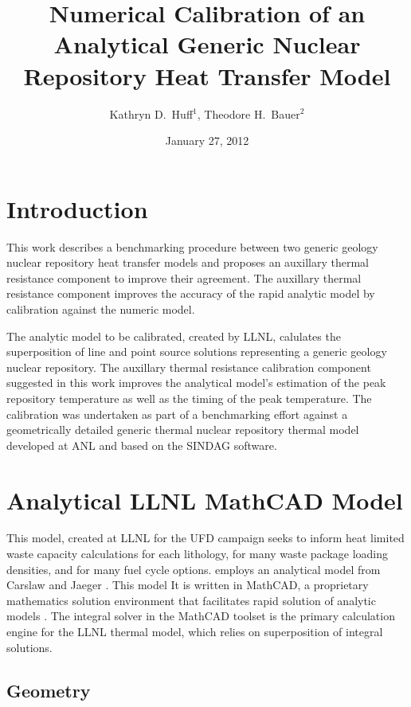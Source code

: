 \documentclass{anstrans}
\title{Numerical Calibration of an Analytical Generic Nuclear Repository Heat 
Transfer Model}
\author{Kathryn D.~Huff$^1$, Theodore H.~Bauer$^2$}
\institute{$^1$Nuclear Engineering \& Engineering Physics Dept., University of 
Wisconsin, Madison, WI, 53706\\
$^2$Nuclear Engineering Division, Argonne National Laboratory, Argonne, IL, 
60439}
\date{January 27, 2012}
\begin{document}
\section{Introduction}

This work describes a benchmarking procedure between two generic geology nuclear 
repository heat transfer models and proposes an auxillary thermal resistance 
component to improve their agreement. The auxillary thermal resistance component 
improves the accuracy of the rapid analytic model by calibration against
the numeric model. 

The analytic model to be calibrated, created by \gls{LLNL}, calulates the 
superposition of line and point source solutions representing a generic geology 
nuclear repository. The auxillary thermal resistance calibration component 
suggested in this work improves the analytical model's estimation of the peak 
repository temperature as well as the timing of the peak temperature. The 
calibration was undertaken as part of a benchmarking effort against a 
geometrically detailed generic thermal nuclear repository thermal model 
developed at \gls{ANL} and based on the \gls{SINDAG} software\cite{SINDAG}.




\section{Analytical LLNL MathCAD Model}

This model, created at \gls{LLNL} for the \gls{UFD} campaign seeks to inform 
heat limited waste capacity calculations for each lithology, for many waste 
package loading densities, and for many fuel cycle options.  employs an 
analytical model from Carslaw and Jaeger \cite{carslaw}.  This model It is 
written in MathCAD, a proprietary mathematics solution environment that 
facilitates rapid solution of analytic models \cite{MathCAD}. The integral solver in the 
MathCAD toolset is the primary calculation engine for the LLNL thermal model, 
which relies on superposition of integral solutions.  

\subsection{Geometry}
\end{document}
